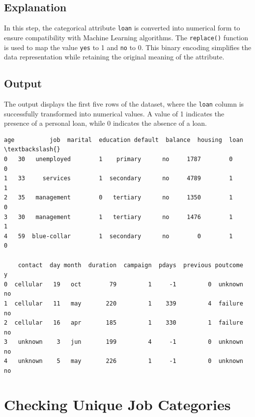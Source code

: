 \documentclass[11pt]{article}
\makeatletter
\newcommand{\boxspacing}{\kern\kvtcb@left@rule\kern\kvtcb@boxsep}
\newcommand{\prompt}[4]{
        {\ttfamily\llap{{\color{#2}[#3]:\hspace{3pt}#4}}\vspace{-\baselineskip}}
    }
\makeatother
\begin{document}
\subsection*{Explanation}
In this step, the categorical attribute \texttt{loan} is converted into numerical form to ensure compatibility with Machine Learning algorithms. The \texttt{replace()} function is used to map the value \texttt{yes} to 1 and \texttt{no} to 0. This binary encoding simplifies the data representation while retaining the original meaning of the attribute.

\subsection*{Output}
The output displays the first five rows of the dataset, where the \texttt{loan} column is successfully transformed into numerical values. A value of 1 indicates the presence of a personal loan, while 0 indicates the absence of a loan.

\begin{tcolorbox}[breakable, size=fbox, boxrule=.5pt, pad at break*=1mm, opacityfill=0]
\prompt{Out}{outcolor}{7}{\boxspacing}
\begin{Verbatim}[commandchars=\\\{\}]
   age          job  marital  education default  balance  housing  loan  \textbackslash{}
0   30   unemployed        1    primary      no     1787        0     0
1   33     services        1  secondary      no     4789        1     1
2   35   management        0   tertiary      no     1350        1     0
3   30   management        1   tertiary      no     1476        1     1
4   59  blue-collar        1  secondary      no        0        1     0

    contact  day month  duration  campaign  pdays  previous poutcome   y
0  cellular   19   oct        79         1     -1         0  unknown  no
1  cellular   11   may       220         1    339         4  failure  no
2  cellular   16   apr       185         1    330         1  failure  no
3   unknown    3   jun       199         4     -1         0  unknown  no
4   unknown    5   may       226         1     -1         0  unknown  no
\end{Verbatim}
\end{tcolorbox}
        
\section{Checking Unique Job Categories}    
        
\end{document}
